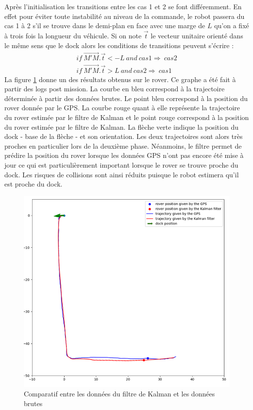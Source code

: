 \documentclass[12pt]{report}
\begin{document}
Après l'initialisation les transitions entre les cas 1 et 2 se font différemment. En effet pour éviter toute instabilité au niveau de la commande, le robot passera du cas 1 à 2 s'il se trouve dans le demi-plan en face avec une marge de $L$ qu'on a fixé à trois fois la longueur du véhicule. Si on note $\overrightarrow{t}$ le vecteur unitaire orienté dans le même sens que le dock alors les conditions de transitions peuvent s'écrire : 
\begin{eqnarray}
    if \ \overrightarrow{M'M} . \overrightarrow{t}<-L \ and \ cas 1 \Rightarrow  \ cas 2 \\ 
    if \ \overrightarrow{M'M} . \overrightarrow{t}>L \ and \ cas 2 \Rightarrow  \ cas 1
\end{eqnarray}
La figure \ref{fig:KalmanvsGPS} donne un des résultats obtenus sur le rover. Ce graphe a été fait à partir des logs post mission. La courbe en bleu correspond à la trajectoire déterminée à partir des données brutes. Le point bleu correspond à la position du rover donnée par le GPS. La courbe rouge quant à elle représente la trajectoire du rover estimée par le filtre de Kalman et le point rouge correspond à la position du rover estimée par le filtre de Kalman. La flèche verte indique la position du dock - base de la flèche - et son orientation. Les deux trajectoires sont alors très proches en particulier lors de la deuxième phase. Néanmoins, le filtre permet de prédire la position du rover lorsque les données GPS n'ont pas encore été mise à jour ce qui est particulièrement important lorsque le rover se trouve proche du dock. Les risques de collisions sont ainsi réduits puisque le robot estimera qu'il est proche du dock. 
\begin{figure}
  \centering
  \includegraphics[width=.8\textwidth]{imgs/GPSvsKalman.png}
  \caption{Comparatif entre les données du filtre de Kalman et les données brutes}
  \label{fig:KalmanvsGPS}
\end{figure}
\end{document}

